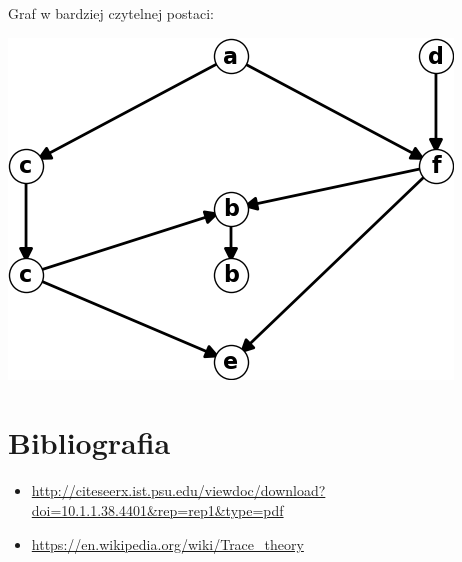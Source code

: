 \documentclass[12pt]{article}
\begin{document}
\noindent
Graf w bardziej czytelnej postaci:
\begin{center}
\centering
    \includegraphics[scale=0.6]{graph2_reduced_pretty.png}
\end{center}


\section{Bibliografia}
\begin{itemize}
    \item \url{http://citeseerx.ist.psu.edu/viewdoc/download?doi=10.1.1.38.4401&rep=rep1&type=pdf}
    \item \url{https://en.wikipedia.org/wiki/Trace_theory}

\end{itemize}
\end{document}
